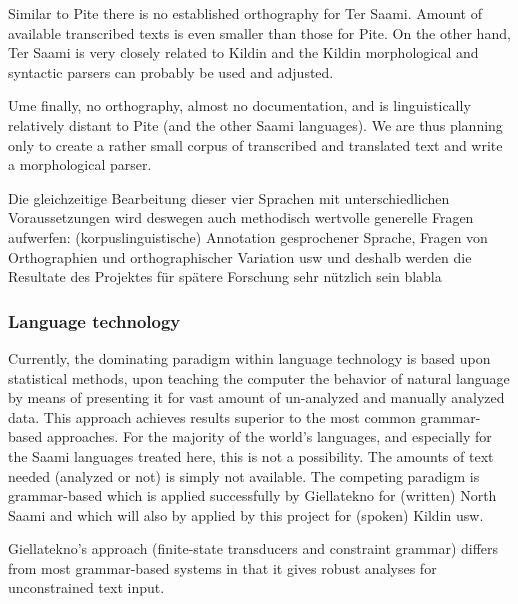\documentclass[a4paper,12pt]{article}
\begin{document}
Similar to Pite there is no established orthography for Ter Saami. Amount of available transcribed texts is even smaller than those for Pite.  On the other hand, Ter Saami is very closely related to Kildin and the Kildin morphological and syntactic parsers can probably be used and adjusted.

Ume finally, no orthography, almost no documentation, and is linguistically relatively distant to Pite (and the other Saami languages). We are thus planning only to create a rather small corpus of transcribed and translated text and write a morphological parser.

Die gleichzeitige Bearbeitung dieser vier Sprachen mit unterschiedlichen Voraussetzungen wird deswegen auch methodisch wertvolle generelle Fragen aufwerfen: (korpuslinguistische) Annotation gesprochener Sprache, Fragen von Orthographien und orthographischer Variation usw und deshalb werden die Resultate des Projektes für spätere Forschung sehr nützlich sein blabla

\subsubsection{Language technology} %
Currently, the dominating paradigm within language technology is based upon statistical methods, upon teaching the computer the behavior of natural language by means of presenting it for vast amount of un-analyzed and manually analyzed data. This approach achieves results superior to the most common grammar-based approaches. For the majority of the world's languages, and especially for the Saami languages treated here, this is not a possibility. The amounts of text needed (analyzed or not) is simply not available. The competing paradigm is grammar-based which is applied successfully by Giellatekno for (written) North Saami and which will also by applied by this project for (spoken) Kildin usw.

Giellatekno's approach (finite-state transducers and constraint grammar) differs from most grammar-based systems in that it gives robust analyses for unconstrained text input.
\end{document}
